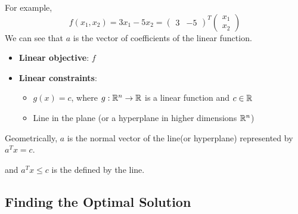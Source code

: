 \begin{example}
    For example, \[
        f(x_1, x_2) = 3x_1 - 5x_2 = \begin{pmatrix} 3 & -5 \end{pmatrix}^T \begin{pmatrix} x_1 \\ x_2 \end{pmatrix}
    \] We can see that $a$ is the vector of coefficients of the linear function.
\end{example}

\begin{itemize}
    \item \textbf{Linear objective}: $f$
    \item \textbf{Linear constraints}:
    \begin{itemize}
        \item $g(x) = c$, where $g: \mathbb{R}^n \to \mathbb{R}$ is a linear function and $c \in \mathbb{R}$
        \item Line in the plane (or a hyperplane in higher dimensions $\mathbb{R}^n$)
    \end{itemize}
\end{itemize}

Geometrically, $a$ is the normal vector of the line(or hyperplane) represented by $a^Tx = c$.

\begin{figure}[ht!]
    \centering
\end{figure}

and $a^Tx \leq c$ is the  defined by the line.

\subsection{Finding the Optimal Solution}

